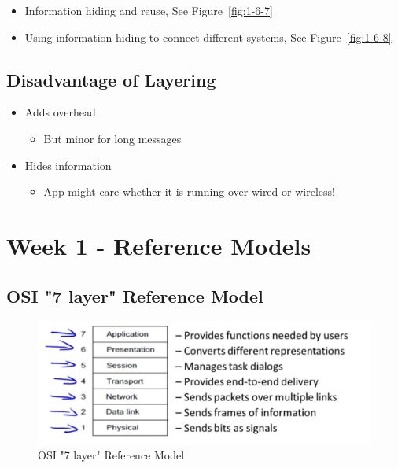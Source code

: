 \documentclass[12pt]{ctexart}   %
\begin{document}
	 \begin{itemize}
	 	\item Information hiding and reuse, See Figure~\ref{fig:1-6-7}
	 	
	 	\item Using information hiding to connect different systems, See Figure~\ref{fig:1-6-8}
	 \end{itemize}
	 
	 \subsection{Disadvantage of Layering}
	 \begin{itemize}
	 	\item Adds overhead
	 	\begin{itemize}
	 		\item But minor for long messages
	 	\end{itemize}
	 	
	 	\item Hides information
	 	\begin{itemize}
	 		\item App might care whether it is running over wired or wireless!
	 	\end{itemize}
	 \end{itemize}

\section{Week 1 - Reference Models}
	\subsection{OSI "7 layer" Reference Model}
	
	\begin{figure}[h!] %
	 \centering
	 \includegraphics[scale=0.7]{images/1-7-1}
	\caption{ OSI "7 layer" Reference Model }
	 \label{fig:1-7-1}
	 \end{figure}
	 
\end{document}
